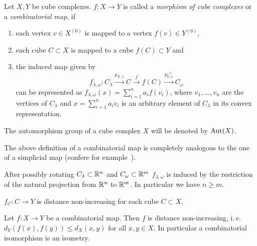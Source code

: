 \begin{defin}
  \label{def:morphism-ccc}
  Let \(X,Y\) be cube complexes. \(f\colon X \to Y\) is called a \emph{morphism of cube complexes} or a \emph{combinatorial map}, if
  \begin{enumerate}
  \item each vertex \(v \in X^{(0)}\) is mapped to a vertex \(f(v) \in Y^{(0)}\),
  \item each cube \(C \subset X\) is mapped to a cube \(f(C) \subset Y\) and
  \item the induced map given by
    \[
      f_{\lambda, \omega}\colon C_\lambda \xrightarrow{p_{X,\lambda}} C \xrightarrow{f} f(C) \xrightarrow{p^{-1}_{Y,\omega}} C_\omega
    \]
    can be represented as \(f_{\lambda,\omega}(x) = \sum_{i=1}^n a_i f(v_i)\), where \(v_1, \dots, v_n\) are the vertices of \(C_\lambda\) and \(x = \sum_{i=1}^n a_i v_i\) is an arbitrary element of \(C_\lambda\) in its convex representation.
  \end{enumerate}
  The automorphism group of a cube complex \(X\) will be denoted by \(\operatorname{Aut}(X)\).
\end{defin}

\begin{rem}
  The above definition of a combinatorial map is completely analogous to the one of a simplicial map (confere for example~\cite{Singer}).
\end{rem}

\begin{lemma}
  After possibly rotating \(C_\lambda \subset \mathbb{R}^n\) and \(C_\omega \subset \mathbb{R}^m\) \(f_{\lambda, \omega}\) is induced by the restriction of the natural projection from \(\mathbb{R}^n\) to \(\mathbb{R}^m\). In particular we have \(n \geq m\).
\end{lemma}

\begin{cor}
  \(f_C\colon C \to Y\) is distance non-increasing for each cube \(C \subset X\).
\end{cor}

\begin{prop}
  Let \(f\colon X \to Y\) be a combinatorial map. Then \(f\) is distance non-increasing, i.\,e.\ \(d_Y(f(x), f(y)) \leq d_X(x,y)\) for all \(x,y \in X\). In particular a combinatorial isomorphism is an isometry.
\end{prop}

